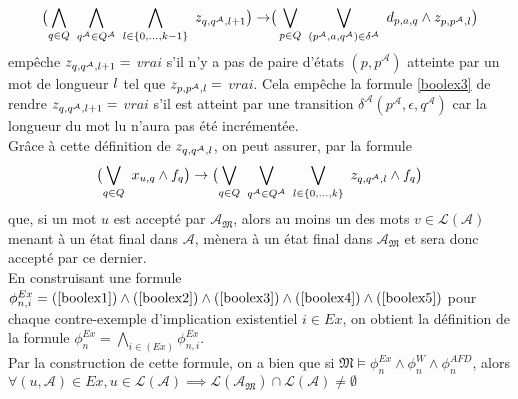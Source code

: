 \documentclass[12pt,a4paper,oneside,titlepage]{report}
\begin{document}
\begin{equation}
\label{boolex4}
\begin{aligned}
\bigl ( \bigwedge_{q\in Q}~ \bigwedge_{q^\mathcal{A}\in Q^\mathcal{A}}~ \bigwedge_{\mathnormal{l}\in\{0,... ,k-1\}}~ z_{q,q^\mathcal{A},\mathnormal{l}+1} \bigr ) \rightarrow \bigr ( \bigvee_{p\in Q}~ \bigvee_{(p^\mathcal{A},a,q^\mathcal{A})\in\delta^\mathcal{A}}~ d_{p,a,q}\land z_{p,p^\mathcal{A},\mathnormal{l}} \bigr )
\end{aligned}
\end{equation}
empêche $z_{q,q^\mathcal{A},\mathnormal{l}+1}=$ $vrai$ s'il n'y a pas de paire d'états $(p,p^\mathcal{A})$ atteinte par un mot de longueur $\mathnormal{l}$ tel que $z_{p,p^\mathcal{A},\mathnormal{l}}=$ $vrai$. Cela empêche la formule \ref{boolex3} de rendre $z_{q,q^\mathcal{A},\mathnormal{l}+1}=$ $vrai$ s'il est atteint par une transition $\delta^\mathcal{A}(p^\mathcal{A},\epsilon,q^\mathcal{A})$ car la longueur du mot lu n'aura pas été incrémentée.\\

\noindent Grâce à cette définition de $z_{q,q^\mathcal{A},\mathnormal{l}}$, on peut assurer, par la formule
\begin{equation}
\label{boolex5}
\begin{aligned}
\bigl ( \bigvee_{q\in Q}~ x_{u,q}\land f_q \bigr ) \rightarrow \bigl ( \bigvee_{q\in Q}~ \bigvee_{q^\mathcal{A}\in Q^\mathcal{A}}~ \bigvee_{\mathnormal{l}\in\{0,...,k\}}~ z_{q,q^\mathcal{A},\mathnormal{l}}\land f_q \bigr )
\end{aligned}
\end{equation}
que, si un mot $u$ est accepté par $\mathcal{A}_\mathfrak{M}$, alors au moins un des mots $v\in\mathcal{L}(\mathcal{A})$ menant à un état final dans $\mathcal{A}$, mènera à un état final dans $\mathcal{A}_\mathfrak{M}$ et sera donc accepté par ce dernier.\\

\noindent En construisant une formule $\phi_{n,i}^{Ex}=(\ref{boolex1})\land(\ref{boolex2})\land(\ref{boolex3})\land(\ref{boolex4})\land(\ref{boolex5})$ pour chaque contre-exemple d'implication existentiel $i\in Ex$, on obtient la définition de la formule $\phi^{Ex}_n=\bigwedge_{i\in(Ex)}\phi_{n,i}^{Ex}$.\\
Par la construction de cette formule, on a bien que si $\mathfrak{M}\models\phi_n^{Ex}\land\phi^{W}_n\land\phi^{AFD}_n$, alors $\forall(u,\mathcal{A})\in Ex, u\in\mathcal{L}(\mathcal{A})\implies \mathcal{L}(\mathcal{A}_\mathfrak{M})\cap\mathcal{L}(\mathcal{A})\neq\emptyset$\\
\end{document}
